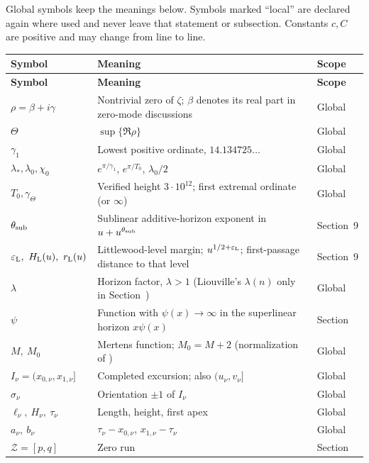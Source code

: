 \documentclass[11pt,reqno]{amsart}
\makeatletter
\let\CG@origref\ref
\newcommand{\CG@gettip}[1]{\@ifundefined{CGTip@#1}{Reference: #1}{\csname CGTip@#1\endcsname}}
\DeclareRobustCommand{\CGref}[1]{\pdftooltip{\CG@origref{#1}}{\CG@gettip{#1}}}
\let\CG@origcite\cite
\renewcommand*{\cite}[2][]{\def\CG@citekey{#2}%
  \ifx\relax#1\relax\CG@origcite{#2}\else\CG@origcite[#1]{#2}\fi}
\numberwithin{equation}{section}
\theoremstyle{plain}
\theoremstyle{definition}
\theoremstyle{remark}
\makeatother
\begin{document}
Global symbols keep the meanings below. Symbols marked ``local'' are
declared again where used and never leave that statement or subsection.
Constants $c,C$ are positive and may change from line to line.

\small
\setlength{\LTpre}{4pt}
\setlength{\LTpost}{8pt}
\begin{longtable}{@{}p{}p{}p{}@{}}
\toprule
\textbf{Symbol} & \textbf{Meaning} & \textbf{Scope}\\
\midrule
\endfirsthead
\toprule
\textbf{Symbol} & \textbf{Meaning} & \textbf{Scope}\\
\midrule
\endhead
$\rho=\beta+i\gamma$ & Nontrivial zero of $\zeta$; $\beta$ denotes its real part in zero-mode discussions & Global\\
$\Theta$ & $\sup\{\Re\rho\}$ & Global\\
$\gamma_1$ & Lowest positive ordinate, $14.134725\ldots$ & Global\\
$\lambda_*,\lambda_0,\chi_0$ & $e^{\pi/\gamma_1}$, $e^{\pi/T_0}$, $\lambda_0/2$ & Global\\
$T_0,\gamma_\Theta$ & Verified height $3\cdot10^{12}$; first extremal ordinate (or $\infty$) & Global\\
$\theta_{\rm sub}$ & Sublinear additive-horizon exponent in $u+u^{\theta_{\rm sub}}$ & Section~9\\
$\varepsilon_{\rm L},\ H_{\rm L}(u),\ r_{\rm L}(u)$ & Littlewood-level margin; $u^{1/2+\varepsilon_{\rm L}}$; first-passage distance to that level & Section~9\\
$\lambda$ & Horizon factor, $\lambda>1$ (Liouville's $\lambda(n)$ only in Section~\CGref{subsec:intro-liouville}) & Global\\
$\psi$ & Function with $\psi(x)\to\infty$ in the superlinear horizon $x\psi(x)$ & Section~\CGref{sec:lacunary}\\
$M,\ M_0$ & Mertens function; $M_0=M+2$ (normalization of \cite{KP86}) & Global\\
$I_\nu=(x_{0,\nu},x_{1,\nu}]$ & Completed excursion; also $(u_\nu,v_\nu]$ & Global\\
$\sigma_\nu$ & Orientation $\pm1$ of $I_\nu$ & Global\\
$\ell_\nu,\ H_\nu,\ \tau_\nu$ & Length, height, first apex & Global\\
$a_\nu,\ b_\nu$ & $\tau_\nu-x_{0,\nu}$, $x_{1,\nu}-\tau_\nu$ & Global\\
$\mathcal Z=[p,q]$ & Zero run & Section~\CGref{sec:formulas}\\

\end{longtable}
\end{document}
